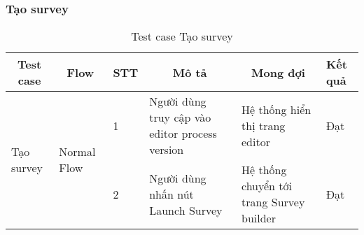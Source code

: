 \subsubsection{Tạo survey}
\begin{table}[H]
\begin{tabular}{|p{2cm}|p{2.5cm}|p{0.5cm}|p{4cm}|p{4cm}|p{1cm}|}
\hline
\multicolumn{1}{|c|}{\textbf{Test case}} & \multicolumn{1}{c|}{\textbf{Flow}} & \textbf{STT} & \multicolumn{1}{c|}{\textbf{Mô tả}} & \multicolumn{1}{c|}{\textbf{Mong đợi}} & \textbf{Kết quả} \\ \hline
\multirow{2}{*}{Tạo survey} & \multirow{2}{*}{Normal Flow} & 1 & Người dùng truy cập vào editor process version & Hệ thống hiển thị trang editor & Đạt \\ \cline{3-6} 
 &  & 2 & Người dùng nhấn nút Launch Survey & Hệ thống chuyển tới trang Survey builder & Đạt \\ \hline
\end{tabular}
\caption{Test case Tạo survey}
\end{table}